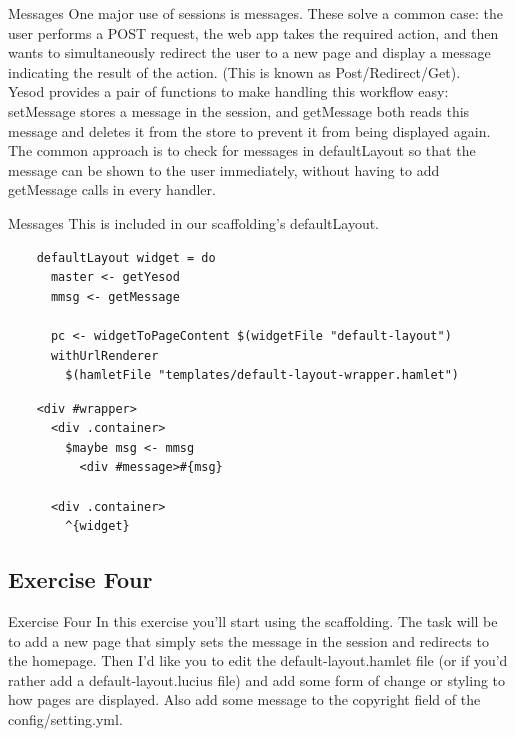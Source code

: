 \documentclass[pdf]{beamer}
\begin{document}
\begin{frame}{Messages}
  One major use of sessions is messages. These solve a common case:
  the user performs a POST request, the web app takes the required
  action, and then wants to simultaneously redirect the user to a new
  page and display a message indicating the result of the
  action. (This is known as Post/Redirect/Get). \\

  Yesod provides a pair of functions to make handling this workflow
  easy: setMessage stores a message in the session, and getMessage
  both reads this message and deletes it from the store to prevent it
  from being displayed again. \\

  The common approach is to check for messages in defaultLayout so
  that the message can be shown to the user immediately, without
  having to add getMessage calls in every handler.
\end{frame}

\begin{frame}[fragile]{Messages}
  This is included in our scaffolding's defaultLayout. \\

  \begin{verbatim}
    defaultLayout widget = do
      master <- getYesod
      mmsg <- getMessage

      pc <- widgetToPageContent $(widgetFile "default-layout")
      withUrlRenderer
        $(hamletFile "templates/default-layout-wrapper.hamlet")
  \end{verbatim}
  \vspace{0.5em}
  \begin{verbatim}
    <div #wrapper>
      <div .container>
        $maybe msg <- mmsg
          <div #message>#{msg}

      <div .container>
        ^{widget}
  \end{verbatim}
\end{frame}

\subsection{Exercise Four}
\begin{frame}[fragile]{Exercise Four}
  In this exercise you'll start using the scaffolding. The task will
  be to add a new page that simply sets the message in the session and
  redirects to the homepage. Then I'd like you to edit the
  default-layout.hamlet file (or if you'd rather add a
  default-layout.lucius file) and add some form of change or styling
  to how pages are displayed. Also add some message to the copyright
  field of the config/setting.yml.
\end{frame}
\end{document}
